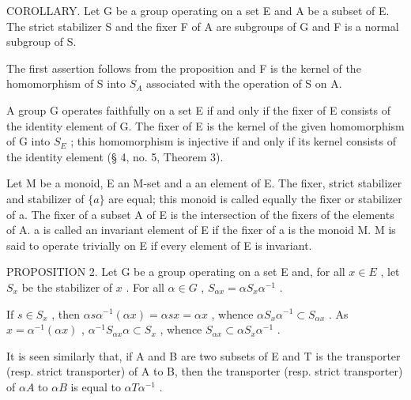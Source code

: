COROLLARY. Let G be a group operating on a set E and A be a subset of E. The strict stabilizer S and the fixer F of A are subgroups of G and F is a normal subgroup of S.

The first assertion follows from the proposition and F is the kernel of the homomorphism of S into \(S_{A}\) associated with the operation of S on A.

A group G operates faithfully on a set E if and only if the fixer of E consists of the identity element of G. The fixer of E is the kernel of the given homomorphism of G into \(S_{E}\) ; this homomorphism is injective if and only if its kernel consists of the identity element (§ 4, no. 5, Theorem 3).

Let M be a monoid, E an M-set and a an element of E. The fixer, strict stabilizer and stabilizer of \(\{a\}\) are equal; this monoid is called equally the fixer or stabilizer of a. The fixer of a subset A of E is the intersection of the fixers of the elements of A. a is called an invariant element of E if the fixer of a is the monoid M. M is said to operate trivially on E if every element of E is invariant.

PROPOSITION 2. Let G be a group operating on a set E and, for all \(x \in E\) , let \(S_x\) be the stabilizer of \(x\) . For all \(\alpha \in G\) , \(S_{\alpha x} = \alpha S_x \alpha^{-1}\) .

If \(s \in S_x\) , then \(\alpha s \alpha^{-1}(\alpha x) = \alpha s x = \alpha x\) , whence \(\alpha S_x \alpha^{-1} \subset S_{\alpha x}\) . As \(x = \alpha^{-1}(\alpha x)\) , \(\alpha^{-1}S_{\alpha x} \alpha \subset S_x\) , whence \(S_{\alpha x} \subset \alpha S_x \alpha^{-1}\) .

It is seen similarly that, if A and B are two subsets of E and T is the transporter (resp. strict transporter) of A to B, then the transporter (resp. strict transporter) of \(\alpha A\) to \(\alpha B\) is equal to \(\alpha T\alpha^{-1}\) .
\relax{}

